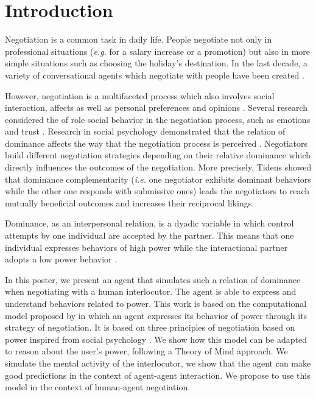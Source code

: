 \documentclass[sigconf]{aamas}  %
\begin{document}
	
	\maketitle

	
	\section{Introduction}
	
	Negotiation is a common task in daily life. People negotiate not only in professional situations (\emph{e.g.} for a salary increase or a promotion) but also in more simple situations such as choosing the holiday's destination. In the last decade, a variety of conversational agents which negotiate with people  have been created \cite{pynadath2013you,gratch2016misrepresentation,klatt2011negotiations}.
	
	However, negotiation is a multifaceted process which also involves social interaction, affects as well as personal preferences and opinions  \cite{bro2010affective}. Several research considered the of role social behavior in the negotiation process, such as emotions and trust	\cite{de2011effect}. Research in social psychology demonstrated that the relation of dominance affects the way that the negotiation process is perceived \cite{van2006power}. Negotiators build different negotiation strategies depending on their relative dominance which directly influences the outcomes of the negotiation. More precisely, Tidens \cite{tiedens2003power} showed that dominance complementarity (\emph{i.e.} one negotiator exhibits dominant behaviors while the other one responds with submissive ones) leads the negotiators to reach mutually beneficial outcomes and increases their reciprocal likings.
	
	Dominance, as an interpersonal relation, is a dyadic variable in which control attempts by one individual are accepted by the partner. This means that one individual expresses behaviors of high power while the interactional partner adopts a low power behavior \cite{burgoon1998nature}. 
	
	In this poster, we present an agent that simulates such a relation of dominance when negotiating with a human interlocutor. The agent is able to express and understand behaviors related to power. This work is based on the computational model proposed by \cite{ouali2017computational} in which an agent expresses its behavior of power through its strategy of negotiation. It is based on three principles of negotiation based on power inspired from social psychology \cite{de1995impact,van2006power,magee2007power}. We show how this model can be adapted to reason about the user's power, following a Theory of Mind approach. We simulate the mental activity of the interlocutor, we show that the agent can make good predictions in the context of agent-agent interaction. We propose to use this model in the context of human-agent negotiation.
	
\end{document}
